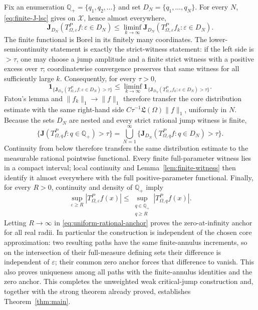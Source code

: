 \documentclass[11pt]{article}
\numberwithin{equation}{section}
\theoremstyle{remark}
\theoremstyle{definition}
\begin{document}
Fix an enumeration \(\mathbb Q_+=\{q_1,q_2,\ldots\}\) and set
\(D_N=\{q_1,\ldots,q_N\}\).  For every \(N\),
\eqref{eq:finite-J-lsc} gives on \(\mathcal X\), hence almost everywhere,
\[
 \mathbf J_{D_N}(T^P_{\Omega,\varepsilon}f:\varepsilon\in D_N)
 \le\liminf_{k\to\infty}
 \mathbf J_{D_N}(T^P_{\Omega,\varepsilon}f_k:\varepsilon\in D_N).
\]
The finite functional is Borel in its finitely many coordinates.  The
lower-semicontinuity statement is exactly the strict-witness statement:
if the left side is \(>\tau\), one may choose a jump amplitude and a finite
strict witness with a positive excess over \(\tau\); coordinatewise
convergence preserves that same witness for all sufficiently large \(k\).
Consequently, for every $\tau>0$,
\[
 \mathbf1_{\{\mathbf J_{D_N}(T^P_{\Omega,\varepsilon}f:
                    \varepsilon\in D_N)>\tau\}}
 \le\liminf_{k\to\infty}
   \mathbf1_{\{\mathbf J_{D_N}(T^P_{\Omega,\varepsilon}f_k:
                    \varepsilon\in D_N)>\tau\}}.
\]
Fatou's lemma and $\|f_k\|_1\to\|f\|_1$ therefore transfer the core
distribution estimate with the same right-hand side
$C\tau^{-1}\mathfrak L(\Omega)\|f\|_1$, uniformly in \(N\).  Because the
sets \(D_N\) are nested and every strict rational jump witness is finite,
\begin{equation}\label{eq:rational-finite-exhaustion}
 \{\mathbf J(T^P_{\Omega,q}f:q\in\mathbb Q_+)>\tau\}
 =\bigcup_{N=1}^\infty
   \{\mathbf J_{D_N}(T^P_{\Omega,q}f:q\in D_N)>\tau\}.
\end{equation}
Continuity from below therefore transfers the same distribution estimate
to the measurable rational pointwise functional.  Every finite
full-parameter witness lies in a compact interval; local continuity and
Lemma~\ref{lem:finite-witness} then identify it almost everywhere with
the full positive-parameter functional.  Finally, for every $R>0$,
continuity and density of $\mathbb Q_+$ imply
\[
 \sup_{\varepsilon\ge R}|T^P_{\Omega,\varepsilon}f(x)|
 \le \sup_{\substack{q\in\mathbb Q_+\\q\ge R}}
       |T^P_{\Omega,q}f(x)|.
\]
Letting $R\to\infty$ in \eqref{eq:uniform-rational-anchor} proves the
zero-at-infinity anchor for all real radii.  In particular the construction
is independent of the chosen core approximation: two resulting paths
have the same finite-annulus increments, so on the intersection of their
full-measure defining sets their difference is independent of
$\varepsilon$; their common zero anchor forces that difference to vanish.
This also proves uniqueness among all paths with the finite-annulus
identities and the zero anchor.  This completes the unweighted weak critical-jump
construction and, together with the strong theorem already proved,
establishes Theorem~\ref{thm:main}.
\end{document}

